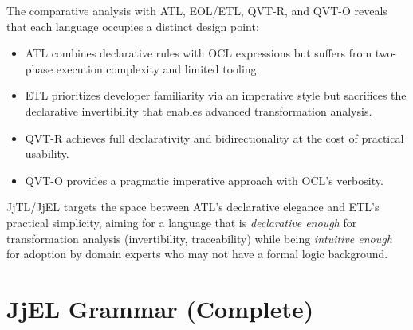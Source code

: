 \documentclass[11pt,a4paper]{article}
\newcommand{\jjel}{\textsf{JjEL}}
\newcommand{\jjtl}{\textsf{JjTL}}
\begin{document}
The comparative analysis with ATL, EOL/ETL, QVT-R, and QVT-O reveals that each language occupies a distinct design point:

\begin{itemize}
    \item ATL combines declarative rules with OCL expressions but suffers from two-phase execution complexity and limited tooling.
    \item ETL prioritizes developer familiarity via an imperative style but sacrifices the declarative invertibility that enables advanced transformation analysis.
    \item QVT-R achieves full declarativity and bidirectionality at the cost of practical usability.
    \item QVT-O provides a pragmatic imperative approach with OCL's verbosity.
\end{itemize}

\jjtl{}/\jjel{} targets the space between ATL's declarative elegance and ETL's practical simplicity, aiming for a language that is \emph{declarative enough} for transformation analysis (invertibility, traceability) while being \emph{intuitive enough} for adoption by domain experts who may not have a formal logic background.


\appendix

\section{JjEL Grammar (Complete)}\label{app:grammar}
\end{document}

